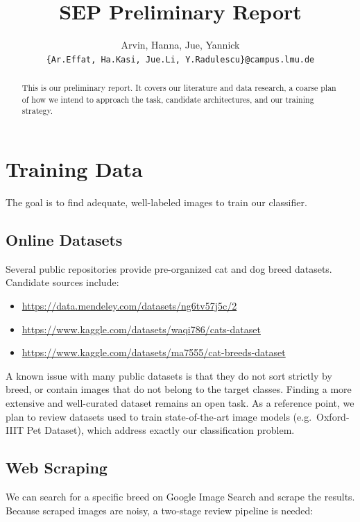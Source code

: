 \documentclass[10pt,twocolumn]{article}
\title{\textbf{SEP Preliminary Report}}
\author{
  Arvin, Hanna, Jue, Yannick \\
  \small\texttt{\{Ar.Effat, Ha.Kasi, Jue.Li, Y.Radulescu\}@campus.lmu.de}
}
\date{}
\begin{document}
\maketitle

\begin{abstract}
This is our preliminary report. It covers our literature and data research,
a coarse plan of how we intend to approach the task, candidate architectures,
and our training strategy.
\end{abstract}

\section{Training Data}

The goal is to find adequate, well-labeled images to train our classifier.

\subsection{Online Datasets}

Several public repositories provide pre-organized cat and dog breed datasets.
Candidate sources include:

\begin{itemize}[noitemsep]
  \item \url{https://data.mendeley.com/datasets/ng6tv57j5c/2}
  \item \url{https://www.kaggle.com/datasets/waqi786/cats-dataset}
  \item \url{https://www.kaggle.com/datasets/ma7555/cat-breeds-dataset}
\end{itemize}

A known issue with many public datasets is that they do not sort strictly by
breed, or contain images that do not belong to the target classes.
Finding a more extensive and well-curated dataset remains an open task.
As a reference point, we plan to review datasets used to train state-of-the-art
image models (e.g.\ Oxford-IIIT Pet Dataset), which address exactly our
classification problem.

\subsection{Web Scraping}

We can search for a specific breed on Google Image Search and scrape the
results. Because scraped images are noisy, a two-stage review pipeline is
needed:
\end{document}
